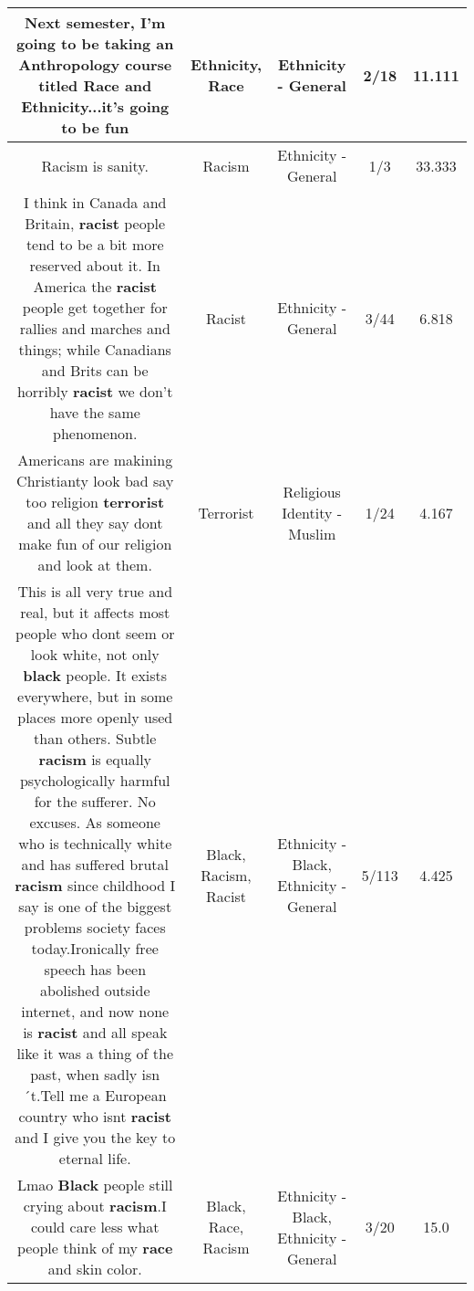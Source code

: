 \documentclass[11pt]{article}
\newlength\mylength
\begin{document}
\begin{center}
\begin{longtable}{|C{.65\mylength}|C{.30\mylength}|C{.12\mylength}|C{.12\mylength}|C{.12\mylength}|}
  \small Next semester, I'm going to be taking an Anthropology course titled \textbf{Race} and \textbf{Ethnicity}...it's going to be fun\normalsize   & Ethnicity, Race & Ethnicity - General & 2/18 & 11.111 \\  \hline
  \small Racism is sanity.\normalsize   & Racism & Ethnicity - General & 1/3 & 33.333 \\  \hline
  \small I think in Canada and Britain, \textbf{racist} people tend to be a bit more reserved about it.  In America the \textbf{racist} people get together for rallies and marches and things; while Canadians and Brits can be horribly \textbf{racist} we don't have the same phenomenon.\normalsize   & Racist & Ethnicity - General & 3/44 & 6.818 \\  \hline
  \small Americans are makining Christianty look bad say too religion \textbf{terrorist} and all they say dont make fun of our religion and look at them.\normalsize   & Terrorist & Religious Identity - Muslim & 1/24 & 4.167 \\  \hline
  \small This is all very true and real, but it affects most people who dont seem or look white, not only \textbf{black} people. It exists everywhere, but in some places more openly used than others. Subtle \textbf{racism} is equally psychologically harmful for the sufferer. No excuses. As someone who is technically white and has suffered brutal \textbf{racism} since childhood I say is one of the biggest problems society faces today.Ironically free speech has been abolished outside internet, and now none is \textbf{racist} and all speak like it was a thing of the past, when sadly isn´t.Tell me a European country who isnt \textbf{racist} and I give you the key to eternal life.\normalsize   & Black, Racism, Racist & Ethnicity - Black, Ethnicity - General & 5/113 & 4.425 \\  \hline
  \small Lmao \textbf{Black} people still crying about \textbf{racism}.I could care less what people think of my \textbf{race} and skin color.\normalsize   & Black, Race, Racism & Ethnicity - Black, Ethnicity - General & 3/20 & 15.0 \\  \hline

\end{longtable}
\end{center}
\end{document}
